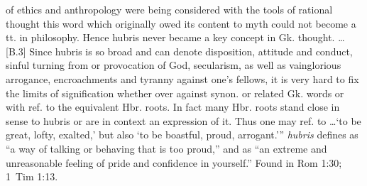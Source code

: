of ethics and anthropology were being considered with the tools of rational thought this word which originally owed its content to myth could not become a tt. in philosophy. Hence hubris never became a key concept in Gk. thought. \ldots [B.3] Since hubris is so broad and can denote disposition, attitude and conduct, sinful turning from or provocation of God, secularism, as well as vainglorious arrogance, encroachments and tyranny against one's fellows, it is very hard to fix the limits of signification whether over against synon. or related Gk. words or with ref. to the equivalent Hbr. roots. In fact many Hbr. roots stand close in sense to hubris or are in context an expression of it. Thus one may ref. to \ldots `to be great, lofty, exalted,' but also `to be boastful, proud, arrogant.''' \emph{hubris} defines as ``a way of talking or behaving that is too proud,'' and as ``an extreme and unreasonable feeling of pride and confidence in yourself.''
Found in Rom 1:30; 1~Tim 1:13.
